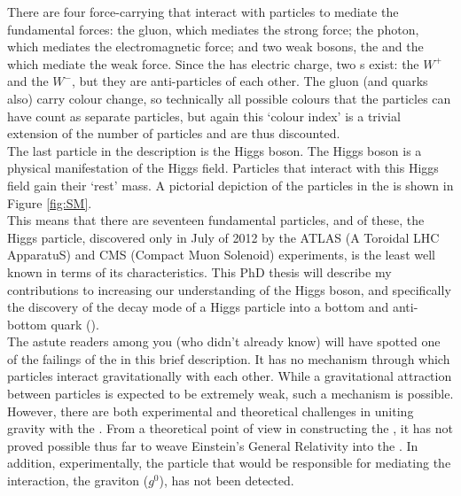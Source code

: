 There are four force-carrying  that interact with particles to mediate the fundamental forces: the gluon, which mediates the strong force; the photon, which mediates the electromagnetic force; and two weak bosons, the \W and the \Z which mediate the weak force. Since the \W has electric charge, two \w s exist: the $W^+$ and the $W^-$, but they are anti-particles of each other. The gluon (and quarks also) carry colour change, so technically all possible colours that the particles can have count as separate particles, but again this `colour index' is a trivial extension of the number of particles and are thus discounted. \\

The last particle in the \SM description is the Higgs boson. The Higgs boson is a physical manifestation of the Higgs field. Particles that interact with this Higgs field gain their `rest' mass. A pictorial depiction of the particles in the \SM is shown in Figure \ref{fig:SM}.\\

This means that there are seventeen fundamental particles, and of these, the Higgs particle, discovered only in July of 2012 by the ATLAS (A Toroidal LHC ApparatuS) \cite{ATLASHiggsDisc} and CMS (Compact Muon Solenoid) \cite{CMSHiggsDisc} experiments, is the least well known in terms of its characteristics. This PhD thesis will describe my contributions to increasing our understanding of the Higgs boson, and specifically the  discovery of the decay mode of a Higgs particle into a bottom and anti-bottom quark (\Hbb).\\

The astute readers among you (who didn't already know) will have spotted one of the failings of the \SM in this brief description. It has no mechanism through which particles interact gravitationally with each other. While a gravitational attraction between particles is expected to be extremely weak, such a mechanism is possible. However, there are both experimental and theoretical challenges in uniting gravity with the \sm. From a theoretical point of view in constructing the \sm, it has not proved possible thus far to weave Einstein's General Relativity into the \sm. In addition, experimentally, the particle that would be responsible for mediating the interaction, the graviton ($g^0$), has not been detected.\\

